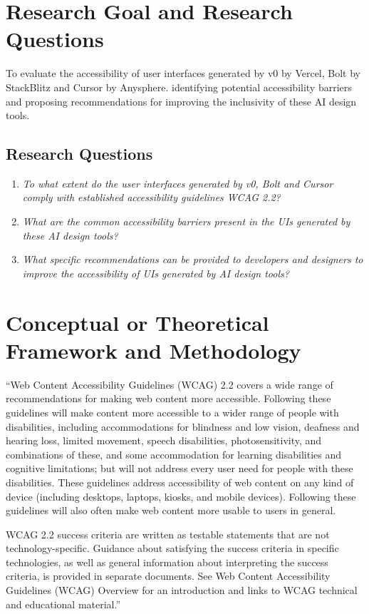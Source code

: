 \documentclass{article}
\begin{document}
\section{Research Goal and Research Questions}
To evaluate the accessibility of user interfaces generated by v0 by Vercel, Bolt by StackBlitz and Cursor by Anysphere.
identifying potential accessibility barriers and proposing recommendations for improving the inclusivity of these AI design tools.

\subsection{Research Questions}

\begin{enumerate}
  \item \textit{To what extent do the user interfaces generated by v0, Bolt and Cursor comply with established accessibility guidelines WCAG 2.2?}
  \item \textit{What are the common accessibility barriers present in the UIs generated by these AI design tools?}
  \item \textit{What specific recommendations can be provided to developers and designers to improve the accessibility of UIs generated by AI design tools?}
\end{enumerate}

\section{Conceptual or Theoretical Framework and Methodology}
“Web Content Accessibility Guidelines (WCAG) 2.2 covers a wide range of recommendations for making web content more accessible.
Following these guidelines will make content more accessible to a wider range of people with disabilities,
including accommodations for blindness and low vision, deafness and hearing loss, limited movement, speech disabilities, photosensitivity,
and combinations of these, and some accommodation for learning disabilities and cognitive limitations;
but will not address every user need for people with these disabilities.
These guidelines address accessibility of web content on any kind of device (including desktops, laptops, kiosks, and mobile devices).
Following these guidelines will also often make web content more usable to users in general.

WCAG 2.2 success criteria are written as testable statements that are not technology-specific.
Guidance about satisfying the success criteria in specific technologies,
as well as general information about interpreting the success criteria, is provided in separate documents.
See Web Content Accessibility Guidelines (WCAG) Overview for an introduction and links to WCAG technical and educational material.” \cite{wcag_2.2}
\end{document}
